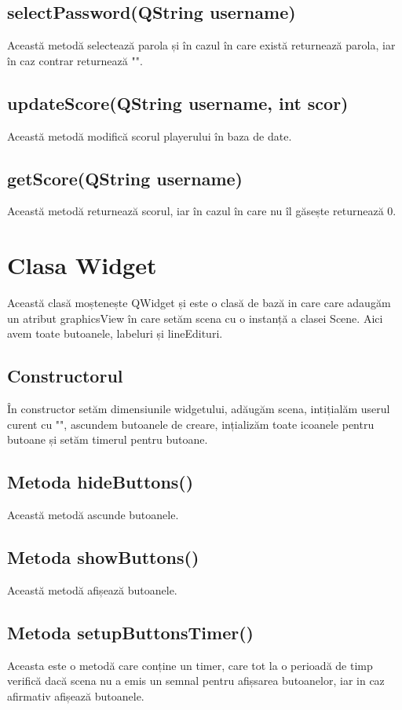 \documentclass{article}
\begin{document}
\subsection{selectPassword(QString username)}
Această metodă selectează parola și în cazul în care există returnează parola, iar în caz contrar returnează "".

\subsection{updateScore(QString username, int scor)}
Această metodă modifică scorul playerului în baza de date.

\subsection{ getScore(QString username)}
Această metodă returnează scorul, iar în cazul în care nu îl găsește returnează 0.

\section{Clasa Widget}
Această clasă moștenește QWidget și este o clasă de bază in care care adaugăm un atribut graphicsView în care setăm scena cu o instanță a clasei Scene. Aici avem toate butoanele, labeluri și lineEdituri.

\subsection{Constructorul}
În constructor setăm dimensiunile widgetului, adăugăm scena, intițialăm userul curent cu "", ascundem butoanele de creare, ințializăm toate icoanele pentru butoane și setăm timerul pentru butoane.

\subsection{Metoda hideButtons()}
Această metodă ascunde butoanele.

\subsection{Metoda showButtons()}
Această metodă afișează butoanele.

\subsection{Metoda setupButtonsTimer()}
Aceasta este o metodă care conține un timer, care tot la o perioadă de timp verifică dacă scena nu a emis un semnal pentru afișsarea butoanelor, iar in caz afirmativ afișează butoanele. 
\end{document}

